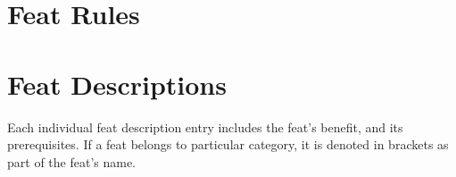 \section{Feat Rules}
\newpage
\section{Feat Descriptions}
Each individual feat description entry includes the feat's benefit, and its prerequisites. If a feat belongs to particular category, it is denoted in brackets as part of the feat's name.

\newpage